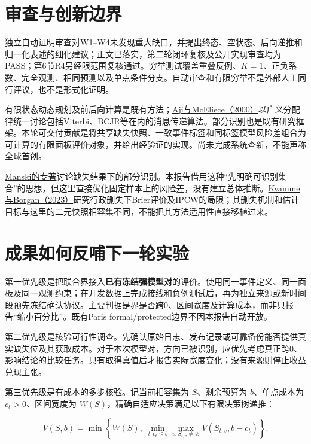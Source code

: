 \documentclass[UTF8,11pt,a4paper,fontset=windows]{ctexart}
\begin{document}
\section{审查与创新边界}

独立自动证明审查对W1--W4未发现重大缺口，并提出终态、空状态、后向递推和归一化表述的细化建议；正文已落实，第二轮闭环复核及公开实现审查均为PASS；第6节R4另经限范围复核通过。穷举测试覆盖重叠反例、$K=1$、正负系数、完全观测、相同预测以及单点条件分支。自动审查和有限穷举不是外部人工同行评议，也不是形式化证明。


有限状态动态规划及前后向计算是既有方法；\href{https://authors.library.caltech.edu/records/sw1pm-bwj40}{Aji与McEliece（2000）}以广义分配律统一讨论包括Viterbi、BCJR等在内的消息传递算法。部分识别也是既有研究框架。本轮可交付贡献是将共享缺失快照、一致事件标签和同标签模型风险差组合为可计算的有限面板评价对象，并给出经验证的实现。尚未完成系统查新，不能声称全球首创。


\href{https://link.springer.com/book/10.1007/b97478}{Manski的专著}讨论缺失结果下的部分识别。本报告借用这种“先明确可识别集合”的思想，但这里直接优化固定样本上的风险差，没有建立总体推断。\href{https://www.jmlr.org/beta/papers/v24/19-1030.html}{Kvamme与Borgan（2023）}研究行政删失下Brier评价及IPCW的局限；其删失机制和估计目标与这里的二元快照相容集不同，不能把其方法适用性直接移植过来。


\section{成果如何反哺下一轮实验}

第一优先级是把联合界接入\textbf{已有冻结强模型对}的评价。使用同一事件定义、同一面板及同一观测约束；在开发数据上完成接线和负例测试后，再为独立来源或新时间段预先冻结确认协议。主要判据是界是否跨0、区间宽度及计算成本，而非只报告“缩小百分比”。既有Paris formal/protected边界不因本报告自动开放。


第二优先级是核验可行性调查。先确认原始日志、发布记录或可靠备份能否提供真实缺失位及其获取成本。对于本次模型对，方向已被识别，应优先考虑真正跨0、影响结论的比较任务。只有取得真值后才报告实际宽度变化；没有来源则停止收益兑现主张。


第三优先级是有成本的多步核验。记当前相容集为 $S$、剩余预算为 $b$、单点成本为 $c_t>0$、区间宽度为 $W(S)$，精确自适应决策满足以下有限决策树递推：


\begin{equation}
V(S,b)=\min\left\{W(S),\;\min_{t:c_t\le b}\max_{v:S_{t,v}\ne\varnothing}V(S_{t,v},b-c_t)\right\}.\tag{R4}
\end{equation}
\end{document}
